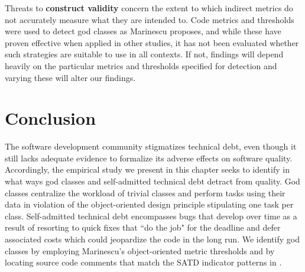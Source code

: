 {Threats to \textbf{construct validity} concern the extent to which indirect metrics do not accurately measure what they are intended to. Code metrics and thresholds were used to detect god classes as Marinescu \cite{marinescu2004detection} proposes, and while these have proven effective when applied in other studies, it has not been evaluated whether such strategies are suitable to use in all contexts. If not, findings will depend heavily on the particular metrics and thresholds specified for detection and varying these will alter our findings.








\section{Conclusion}
\label{chap4:sec:conclusion}


The software development community stigmatizes technical debt, even though it still lacks adequate evidence to formalize its adverse effects on software quality. Accordingly, the empirical study we present in this chapter seeks to identify in what ways god classes and self-admitted technical debt detract from quality. God classes centralize the workload of trivial classes and perform tasks using their data in violation of the object-oriented design principle stipulating one task per class. Self-admitted technical debt encompasses bugs that develop over time as a result of resorting to quick fixes that ``do the job" for the deadline and defer associated costs which could jeopardize the code in the long run. We identify god classes by employing Marinescu's \cite{marinescu2004detection} object-oriented metric thresholds and \SATD by locating source code comments that match the SATD indicator patterns in \cite{ICSM_PotdarS14}.


}

